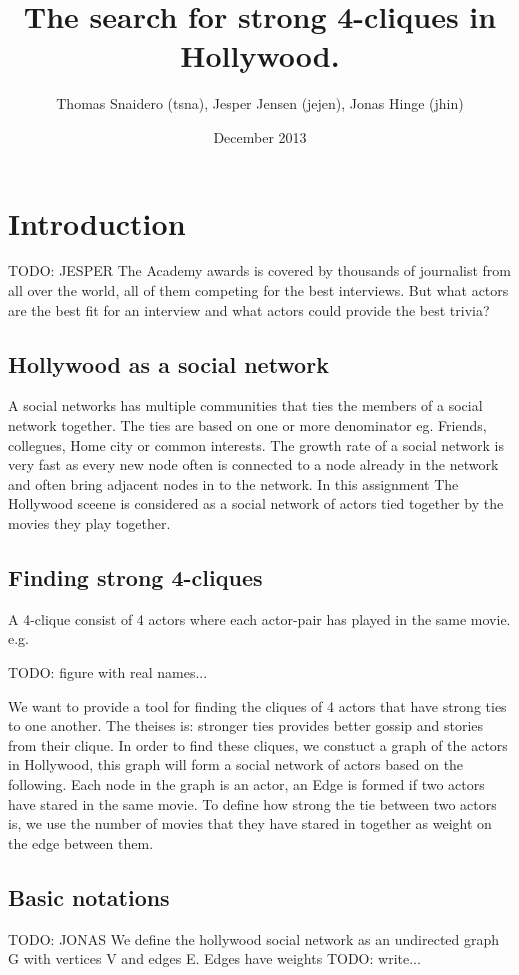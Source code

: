 \documentclass{article}
\title{The search for strong 4-cliques in Hollywood.}
\author{Thomas Snaidero (tsna), Jesper Jensen (jejen), Jonas Hinge (jhin)}
\date{December 2013}
\begin{document}
\maketitle

\section{Introduction}
TODO: JESPER
The Academy awards is covered by thousands of journalist from all over the world, all of them competing for the best interviews. But what actors are the best fit for an interview and what actors could provide the best trivia?

\subsection{Hollywood as a social network}
A social networks has multiple communities that ties the members of a social network together. The ties are based on one or more denominator eg. Friends, collegues, Home city or common interests.
The growth rate of a social network is very fast as every new node often is connected to a node already in the network and often bring adjacent nodes in to the network. In this assignment The Hollywood sceene is considered as a social network of actors tied together by the movies they play together.


\subsection{Finding strong 4-cliques}
A 4-clique consist of 4 actors where each actor-pair has played in the same movie. e.g. 

TODO: figure with real names...

We want to provide a tool for finding the cliques of 4 actors that have strong ties to one another. The theises is: stronger ties provides better gossip and stories from their clique. In order to find these cliques, we constuct a graph of the actors in Hollywood, this graph will form a social network of actors based on the following.
Each node in the graph is an actor, an Edge is formed if two actors have stared in the same movie.
To define how strong the tie between two actors is, we use the number of movies that they have stared in together as weight on the edge between them.

\subsection{Basic notations}
TODO: JONAS
We define the hollywood social network as an undirected graph G with vertices V and edges E.
Edges have weights TODO: write...
\end{document}

